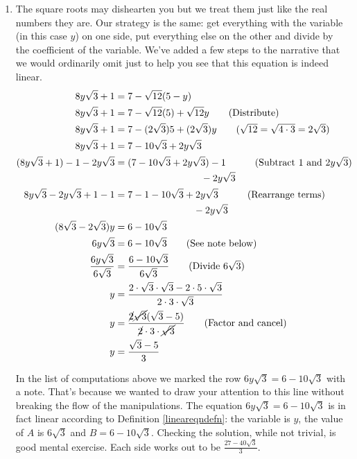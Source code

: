 \begin{ex}
\begin{enumerate}
\item  The square roots may dishearten you but we treat them just like the real numbers they are.  Our strategy is the same:  get everything with the variable (in this case $y$) on one side, put everything else on the other and divide by the coefficient of the variable.  We've added a few steps to the narrative that we would ordinarily omit just to help you see that this equation is indeed linear.
\begin{align*}
8 y \sqrt{3} + 1 & = 7 - \sqrt{12}(5 - y) \\
8 y \sqrt{3} + 1 & = 7 - \sqrt{12}(5)  + \sqrt{12} y \tag{Distribute} \\
8 y \sqrt{3} + 1 & = 7 - (2 \sqrt{3})5 + (2 \sqrt{3})y \tag{$\sqrt{12} = \sqrt{4\cdot 3} = 2 \sqrt{3}$} \\
8 y \sqrt{3} + 1 & = 7 - 10 \sqrt{3} + 2y \sqrt{3}  \\
(8 y \sqrt{3} + 1) - 1 - 2y\sqrt{3} & = \begin{multlined}[t] (7 - 10 \sqrt{3} + 2y \sqrt{3}) - 1 \\
	- 2y\sqrt{3} \end{multlined} \tag{Subtract $1$ and $2y\sqrt{3}$}  \\
8 y \sqrt{3} - 2y\sqrt{3} + 1 - 1 & = \begin{multlined}[t] 7 - 1 - 10 \sqrt{3} + 2y \sqrt{3} \\
	- 2y\sqrt{3} \end{multlined}  \tag{Rearrange terms}  \\
(8\sqrt{3}-2\sqrt{3})y & = 6 - 10 \sqrt{3}  & \\
6 y \sqrt{3} & = 6 - 10 \sqrt{3}  \tag{See note below} \\
\dfrac{6 y \sqrt{3}}{6 \sqrt{3}}  & = \dfrac{6 - 10 \sqrt{3}}{6 \sqrt{3}}  \tag{Divide $6\sqrt{3}$} \\
y & = \dfrac{2 \cdot \sqrt{3} \cdot \sqrt{3} - 2 \cdot 5 \cdot \sqrt{3}}{2 \cdot 3 \cdot \sqrt{3}} & \\
y & = \dfrac{\cancel{2} \cancel{\sqrt{3}}(\sqrt{3} - 5)}{\cancel{2} \cdot 3 \cdot \cancel{\sqrt{3}}} \tag{Factor and cancel} \\
y & = \dfrac{\sqrt{3} - 5}{3} \\
\end{align*}

In the list of computations above we marked the row $6 y \sqrt{3} = 6 - 10 \sqrt{3}$ with a note.  That's because we wanted to draw your attention to this line without breaking the flow of the manipulations.  The equation $6 y \sqrt{3} = 6 - 10 \sqrt{3}$ is in fact linear according to Definition \ref{lineareqndefn}: the variable is $y$, the value of $A$ is $6\sqrt{3}$ and $B = 6 - 10 \sqrt{3}$. Checking the solution, while not trivial, is good mental exercise.  Each side works out to be $\frac{27 - 40 \sqrt{3}}{3}$.


\end{enumerate}
\end{ex}
